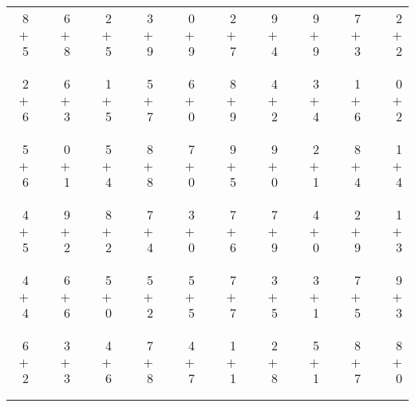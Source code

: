 \documentclass[12pt, letterpaper]{article}
\begin{document}
\begin{tabular}{rrrrrrrrrrrrrrrrrrr}
8 & & 6 & & 2 & & 3 & & 0 & & 2 & & 9 & & 9 & & 7 & & 2\\
$+$ 5 & & $+$ 8 & & $+$ 5 & & $+$ 9 & & $+$ 9 & & $+$ 7 & & $+$ 4 & & $+$ 9 & & $+$ 3 & & $+$ 2\\
\cline{1-1} \cline{3-3} \cline{5-5} \cline{7-7} \cline{9-9} \cline{11-11} \cline{13-13} \cline{15-15} \cline{17-17} \cline{19-19} \\ \\
2 & & 6 & & 1 & & 5 & & 6 & & 8 & & 4 & & 3 & & 1 & & 0\\
$+$ 6 & & $+$ 3 & & $+$ 5 & & $+$ 7 & & $+$ 0 & & $+$ 9 & & $+$ 2 & & $+$ 4 & & $+$ 6 & & $+$ 2\\
\cline{1-1} \cline{3-3} \cline{5-5} \cline{7-7} \cline{9-9} \cline{11-11} \cline{13-13} \cline{15-15} \cline{17-17} \cline{19-19} \\ \\
5 & & 0 & & 5 & & 8 & & 7 & & 9 & & 9 & & 2 & & 8 & & 1\\
$+$ 6 & & $+$ 1 & & $+$ 4 & & $+$ 8 & & $+$ 0 & & $+$ 5 & & $+$ 0 & & $+$ 1 & & $+$ 4 & & $+$ 4\\
\cline{1-1} \cline{3-3} \cline{5-5} \cline{7-7} \cline{9-9} \cline{11-11} \cline{13-13} \cline{15-15} \cline{17-17} \cline{19-19} \\ \\
4 & & 9 & & 8 & & 7 & & 3 & & 7 & & 7 & & 4 & & 2 & & 1\\
$+$ 5 & & $+$ 2 & & $+$ 2 & & $+$ 4 & & $+$ 0 & & $+$ 6 & & $+$ 9 & & $+$ 0 & & $+$ 9 & & $+$ 3\\
\cline{1-1} \cline{3-3} \cline{5-5} \cline{7-7} \cline{9-9} \cline{11-11} \cline{13-13} \cline{15-15} \cline{17-17} \cline{19-19} \\ \\
4 & & 6 & & 5 & & 5 & & 5 & & 7 & & 3 & & 3 & & 7 & & 9\\
$+$ 4 & & $+$ 6 & & $+$ 0 & & $+$ 2 & & $+$ 5 & & $+$ 7 & & $+$ 5 & & $+$ 1 & & $+$ 5 & & $+$ 3\\
\cline{1-1} \cline{3-3} \cline{5-5} \cline{7-7} \cline{9-9} \cline{11-11} \cline{13-13} \cline{15-15} \cline{17-17} \cline{19-19} \\ \\
6 & & 3 & & 4 & & 7 & & 4 & & 1 & & 2 & & 5 & & 8 & & 8\\
$+$ 2 & & $+$ 3 & & $+$ 6 & & $+$ 8 & & $+$ 7 & & $+$ 1 & & $+$ 8 & & $+$ 1 & & $+$ 7 & & $+$ 0\\
\cline{1-1} \cline{3-3} \cline{5-5} \cline{7-7} \cline{9-9} \cline{11-11} \cline{13-13} \cline{15-15} \cline{17-17} \cline{19-19} \\ \\

\end{tabular}
\end{document}
